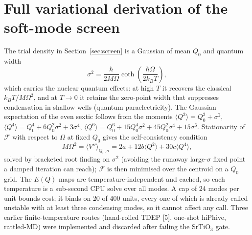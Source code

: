 \documentclass{article}
\begin{document}
\section{Full variational derivation of the soft-mode screen}
\label{app:derivation}
The trial density in Section~\ref{sec:screen} is a Gaussian of mean $Q_0$ and quantum width
\[
\sigma^2=\frac{\hbar}{2M\Omega}\coth\!\left(\frac{\hbar\Omega}{2k_BT}\right),
\]
which carries the nuclear quantum effects: at high $T$ it recovers the classical $k_BT/M\Omega^2$, and at $T\to0$ it retains the zero-point width that suppresses condensation in shallow wells (quantum paraelectricity). The Gaussian expectation of the even sextic follows from the moments $\langle Q^2\rangle=Q_0^2+\sigma^2$, $\langle Q^4\rangle=Q_0^4+6Q_0^2\sigma^2+3\sigma^4$, $\langle Q^6\rangle=Q_0^6+15Q_0^4\sigma^2+45Q_0^2\sigma^4+15\sigma^6$. Stationarity of $\mathcal{F}$ with respect to $\Omega$ at fixed $Q_0$ gives the self-consistency condition
\[
M\Omega^2=\langle V''\rangle_{Q_0,\sigma}=2a+12b\langle Q^2\rangle+30c\langle Q^4\rangle,
\]
solved by bracketed root finding on $\sigma^2$ (avoiding the runaway large-$\sigma$ fixed point a damped iteration can reach); $\mathcal{F}$ is then minimised over the centroid on a $Q_0$ grid. The $E(Q)$ maps are temperature-independent and cached, so each temperature is a sub-second CPU solve over all modes. A cap of 24 modes per unit bounds cost; it binds on 20 of 400 units, every one of which is already called unstable with at least three condensing modes, so it cannot affect any call. Three earlier finite-temperature routes (hand-rolled TDEP [5], one-shot hiPhive, rattled-MD) were implemented and discarded after failing the SrTiO$_3$ gate.
\end{document}
